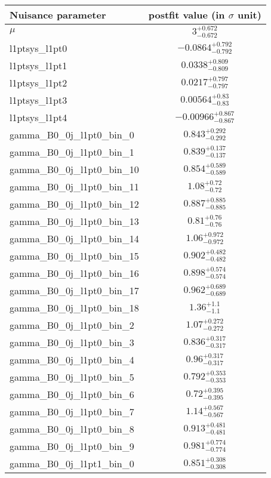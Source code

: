 
\begin{tabular}{|l|c|}
\hline
Nuisance parameter & postfit value (in $\sigma$ unit) \\\hline
$\mu$ & $3^{+0.672}_{-0.672}$ \\
l1ptsys\_l1pt0 & $-0.0864^{+0.792}_{-0.792}$ \\
l1ptsys\_l1pt1 & $0.0338^{+0.809}_{-0.809}$ \\
l1ptsys\_l1pt2 & $0.0217^{+0.797}_{-0.797}$ \\
l1ptsys\_l1pt3 & $0.00564^{+0.83}_{-0.83}$ \\
l1ptsys\_l1pt4 & $-0.00966^{+0.867}_{-0.867}$ \\
gamma\_B0\_0j\_l1pt0\_bin\_0 & $0.843^{+0.292}_{-0.292}$ \\
gamma\_B0\_0j\_l1pt0\_bin\_1 & $0.839^{+0.137}_{-0.137}$ \\
gamma\_B0\_0j\_l1pt0\_bin\_10 & $0.854^{+0.589}_{-0.589}$ \\
gamma\_B0\_0j\_l1pt0\_bin\_11 & $1.08^{+0.72}_{-0.72}$ \\
gamma\_B0\_0j\_l1pt0\_bin\_12 & $0.887^{+0.885}_{-0.885}$ \\
gamma\_B0\_0j\_l1pt0\_bin\_13 & $0.81^{+0.76}_{-0.76}$ \\
gamma\_B0\_0j\_l1pt0\_bin\_14 & $1.06^{+0.972}_{-0.972}$ \\
gamma\_B0\_0j\_l1pt0\_bin\_15 & $0.902^{+0.482}_{-0.482}$ \\
gamma\_B0\_0j\_l1pt0\_bin\_16 & $0.898^{+0.574}_{-0.574}$ \\
gamma\_B0\_0j\_l1pt0\_bin\_17 & $0.962^{+0.689}_{-0.689}$ \\
gamma\_B0\_0j\_l1pt0\_bin\_18 & $1.36^{+1.1}_{-1.1}$ \\
gamma\_B0\_0j\_l1pt0\_bin\_2 & $1.07^{+0.272}_{-0.272}$ \\
gamma\_B0\_0j\_l1pt0\_bin\_3 & $0.836^{+0.317}_{-0.317}$ \\
gamma\_B0\_0j\_l1pt0\_bin\_4 & $0.96^{+0.317}_{-0.317}$ \\
gamma\_B0\_0j\_l1pt0\_bin\_5 & $0.792^{+0.353}_{-0.353}$ \\
gamma\_B0\_0j\_l1pt0\_bin\_6 & $0.72^{+0.395}_{-0.395}$ \\
gamma\_B0\_0j\_l1pt0\_bin\_7 & $1.14^{+0.567}_{-0.567}$ \\
gamma\_B0\_0j\_l1pt0\_bin\_8 & $0.913^{+0.481}_{-0.481}$ \\
gamma\_B0\_0j\_l1pt0\_bin\_9 & $0.981^{+0.774}_{-0.774}$ \\
gamma\_B0\_0j\_l1pt1\_bin\_0 & $0.851^{+0.308}_{-0.308}$ \\

\end{tabular}
